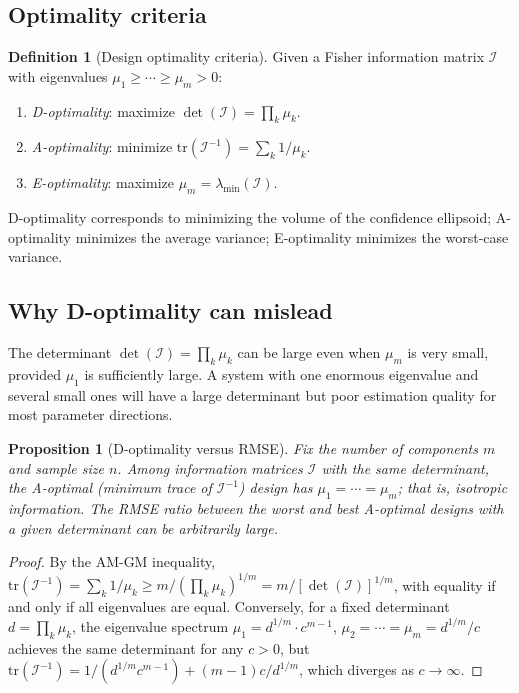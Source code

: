 \documentclass[12pt]{article}
\newtheorem{proposition}[theorem]{Proposition}
\theoremstyle{definition}
\newtheorem{definition}[theorem]{Definition}
\theoremstyle{remark}
\newcommand{\tr}{\mathrm{tr}}
\begin{document}
\subsection{Optimality criteria}
\label{sec:optimality-criteria}

\begin{definition}[Design optimality criteria]
\label{def:optimality}
Given a Fisher information matrix $\mathcal{I}$ with eigenvalues
$\mu_1 \geq \cdots \geq \mu_m > 0$:
\begin{enumerate}[label=(\alph*)]
  \item \emph{D-optimality}: maximize $\det(\mathcal{I}) = \prod_k \mu_k$.
  \item \emph{A-optimality}: minimize $\tr(\mathcal{I}^{-1}) = \sum_k 1/\mu_k$.
  \item \emph{E-optimality}: maximize $\mu_m = \lambda_{\min}(\mathcal{I})$.
\end{enumerate}
\end{definition}

D-optimality corresponds to minimizing the volume of the confidence
ellipsoid; A-optimality minimizes the average variance;
E-optimality minimizes the worst-case variance.

\subsection{Why D-optimality can mislead}
\label{sec:d-misleading}

The determinant $\det(\mathcal{I}) = \prod_k \mu_k$ can be large even
when $\mu_m$ is very small, provided $\mu_1$ is sufficiently large.
A system with one enormous eigenvalue and several small ones will have
a large determinant but poor estimation quality for most parameter
directions.

\begin{proposition}[D-optimality versus RMSE]
\label{prop:d-vs-rmse}
Fix the number of components $m$ and sample size $n$.  Among
information matrices $\mathcal{I}$ with the same determinant, the
A-optimal (minimum trace of $\mathcal{I}^{-1}$) design has
$\mu_1 = \cdots = \mu_m$; that is, isotropic information.  The RMSE
ratio between the worst and best A-optimal designs with a given
determinant can be arbitrarily large.
\end{proposition}

\begin{proof}
By the AM-GM inequality,
$\tr(\mathcal{I}^{-1}) = \sum_k 1/\mu_k \geq m / (\prod_k \mu_k)^{1/m}
= m / [\det(\mathcal{I})]^{1/m}$,
with equality if and only if all eigenvalues are equal.  Conversely,
for a fixed determinant $d = \prod_k \mu_k$, the eigenvalue spectrum
$\mu_1 = d^{1/m} \cdot c^{m-1}$,
$\mu_2 = \cdots = \mu_m = d^{1/m} / c$
achieves the same determinant for any $c > 0$, but
$\tr(\mathcal{I}^{-1}) = 1/(d^{1/m} c^{m-1}) + (m-1)c / d^{1/m}$,
which diverges as $c \to \infty$.
\end{proof}
\end{document}
